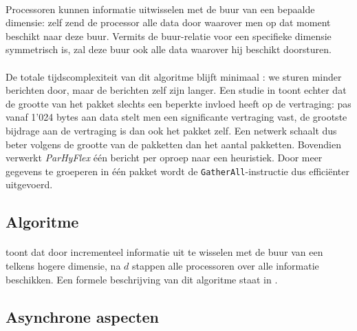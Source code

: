 \paragraph{}
Processoren kunnen informatie uitwisselen met de buur van een bepaalde dimensie: zelf zend de processor alle data door waarover men op dat moment beschikt naar deze buur. Vermits de buur-relatie voor een specifieke dimensie symmetrisch is, zal deze buur ook alle data waarover hij beschikt doorsturen.

\paragraph{}
De totale tijdscomplexiteit van dit algoritme blijft minimaal : we sturen minder berichten door, maar de berichten zelf zijn langer. Een studie in \cite{journals/tjs/TaboadaTD12} toont echter dat de grootte van het pakket slechts een beperkte invloed heeft op de vertraging: pas vanaf 1'024 bytes aan data stelt men een significante vertraging vast, de grootste bijdrage aan de vertraging is dan ook het pakket zelf. Een netwerk schaalt dus beter volgens de grootte van de pakketten dan het aantal pakketten. Bovendien verwerkt \emph{ParHyFlex} \'e\'en bericht per oproep naar een heuristiek. Door meer gegevens te groeperen in \'e\'en pakket wordt de \texttt{GatherAll}-instructie dus effici\"enter uitgevoerd.

\subsection{Algoritme}

\paragraph{}
 toont dat door incrementeel informatie uit te wisselen met de buur van een telkens hogere dimensie, na $d$ stappen alle processoren over alle informatie beschikken. Een formele beschrijving van dit algoritme staat in .


\subsection{Asynchrone aspecten}

